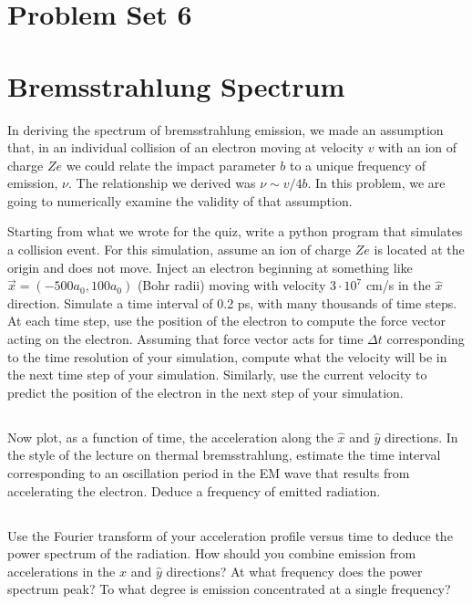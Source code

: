 \documentclass[11pt]{article}
\begin{document}
\pagestyle{empty}

\section*{\centering Problem Set 6}

\section{Bremsstrahlung Spectrum}

In deriving the spectrum of bremsstrahlung emission, we made an assumption that, in an
individual collision of an electron moving at velocity $v$ with an ion of charge $Ze$
we could relate the impact parameter $b$ to a unique frequency of emission, $\nu$.  The
relationship we derived was $\nu\sim v/4b$.
In this problem, we are going to numerically examine the validity of that assumption.

Starting from what we wrote for the quiz, write a python program that simulates a collision event.  For this simulation,
assume an ion of charge $Ze$ is located at the origin and does not move.  Inject an
electron beginning at something like $\vec x=(-500a_0,100a_0)$ (Bohr radii) moving with velocity
$3\cdot10^7$ cm/s in the $\hat x$ direction.  Simulate a time interval of 0.2 ps, with many thousands
of time steps.  At each time step, use the position of the electron to compute the force
vector acting on the electron.  Assuming that force vector acts for time $\Delta t$ corresponding
to the time resolution of your simulation, compute what the velocity will be in the next time step of
your simulation.  Similarly, use the current velocity to predict the position of the electron in the
next step of your simulation.

\subsection{}

Now plot, as a function of time, the acceleration along the $\hat x$ and $\hat y$ directions.  In the style of
the lecture on thermal bremsstrahlung, estimate the time interval corresponding to an oscillation period in the
EM wave that results from accelerating the electron.  Deduce a frequency of emitted radiation.

\subsection{}
Use the Fourier transform of your acceleration profile versus time to deduce the power spectrum of the radiation.  How
should you combine emission from accelerations in the $\hat x$ and $\hat y$ directions?  At
what frequency does the power spectrum peak?  To what degree is emission concentrated at a single frequency?
\end{document}
